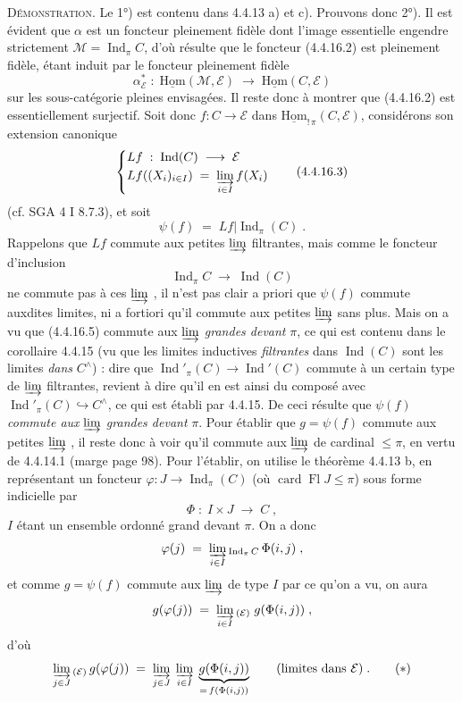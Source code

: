 \documentclass[11pt]{article}
\newcommand{\printedpage}[1]{\if\relax\detokenize{#1}\relax\else\marginpar{\footnotesize p.~#1}\fi}
\newcommand{\msp}[1]{\marginpar{\footnotesize [#1]}}
\newcommand{\uHom}{\underline{\mathrm{Hom}}}
\newcommand{\card}{\operatorname{card}}
\newcommand{\Fl}{\operatorname{Fl}}
\newcommand{\Ind}{\operatorname{Ind}}
\begin{document}
\textsc{Démonstration}. Le 1°) est contenu dans 4.4.13 a) et c). Prouvons donc 2°). Il est évident que $\alpha$ est un foncteur pleinement fidèle dont l'image essentielle engendre strictement
\printedpage{27}
$\mathcal{M}=\Ind_\pi C$, d'où résulte que le foncteur (4.4.16.2) est pleinement fidèle, étant induit par le foncteur pleinement fidèle
\[
\alpha^*_{\mathcal{E}}\;:\;\uHom(\mathcal{M},\mathcal{E})\;\longrightarrow\;\uHom(C,\mathcal{E})
\]
\msp{page 103}
sur les sous-catégorie pleines envisagées. Il reste donc à montrer que (4.4.16.2) est essentiellement surjectif. Soit donc $f:C\longrightarrow\mathcal{E}$ dans $\uHom_{!\,\pi}(C,\mathcal{E})$, considérons son extension canonique %
\[
\left\{
\begin{aligned}
&Lf\;:\;\Ind(C)\;\longrightarrow\;\mathcal{E}\\
&Lf((X_i)_{i\in I})\;=\;\varinjlim_{i\in I}f(X_i)
\end{aligned}
\right.
\tag*{(4.4.16.3)}
\]
(cf. SGA 4 I 8.7.3), et soit
\[
\psi(f)\;=\;Lf|\Ind_\pi(C)\;. \tag*{(4.4.16.4)}
\]
Rappelons que $Lf$ commute aux petites $\varinjlim$ filtrantes, mais comme le foncteur d'inclusion
\[
\Ind_\pi C\;\longrightarrow\;\Ind(C) \tag*{(4.4.16.5)}
\]
ne commute pas à ces $\varinjlim$ , il n'est pas clair a priori que $\psi(f)$ commute auxdites limites, ni a fortiori qu'il commute aux petites $\varinjlim$ sans plus. Mais on a vu que (4.4.16.5) commute aux $\varinjlim$ \textit{grandes devant} $\pi$, ce qui est contenu dans le corollaire 4.4.15 (vu que les limites inductives \textit{filtrantes} dans $\Ind(C)$ sont les limites \textit{dans} $C^\wedge$) : dire que $\Ind'_\pi(C)\longrightarrow\Ind'(C)$ commute à un certain type de $\varinjlim$ filtrantes, revient à dire qu'il en est ainsi du composé avec $\Ind'_\pi(C)\hookrightarrow C^\wedge$, ce qui est établi par 4.4.15. De ceci résulte que $\psi(f)$ \textit{commute aux} $\varinjlim$ \textit{grandes devant} $\pi$. Pour établir que $g=\psi(f)$ commute
\msp{page 104}
aux petites $\varinjlim$ , il reste donc à voir qu'il commute aux $\varinjlim$ de cardinal $\leqslant\pi$, en vertu de 4.4.14.1 (marge page 98). Pour l'établir, on utilise le théorème 4.4.13 b, en représentant un foncteur $\varphi:J\longrightarrow\Ind_\pi(C)$ (où $\card\Fl J\leqslant\pi$) sous forme indicielle par
\[
\Phi\;:\;I\times J\;\longrightarrow\;C\;, \tag*{(4.4.16.6)}
\]
$I$ étant un ensemble ordonné grand devant $\pi$. On a donc
\[
\varphi(j)\;=\;\varinjlim_{i\in I}{}_{\Ind_\pi C}\,\Phi(i,j)\;,
\]
et comme $g=\psi(f)$ commute aux $\varinjlim$ de type $I$ par ce qu'on a vu, on aura
\[
g(\varphi(j))\;=\;\varinjlim_{i\in I}{}_{(\mathcal{E})}\;g(\Phi(i,j))\;,
\]
d'où
\[
\varinjlim_{j\in J}{}_{(\mathcal{E})}\,g(\varphi(j))\;=\;\varinjlim_{j\in J}\;\varinjlim_{i\in I}\;\underbrace{g(\Phi(i,j))}_{=\,f(\Phi(i,j))}\qquad\text{(limites dans $\mathcal{E}$)}\;. \tag*{$(*)$}
\]
\printedpage{28}
\end{document}
